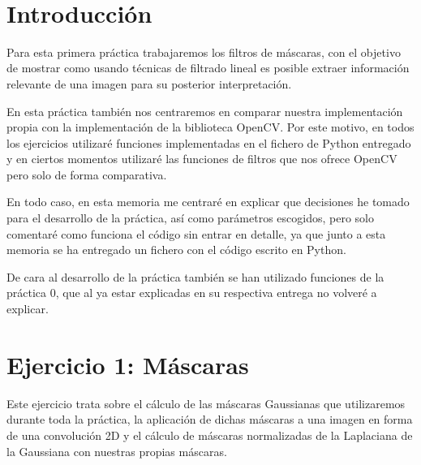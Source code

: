 \documentclass[12pt, spanish]{article}
\makeatletter
\let\thedate\@date
\makeatother
\begin{document}
\begin{titlepage}
    {\large \thedate}\\[0.5cm]
    {\doclicenseThis}

    \vfill

\end{titlepage}


\tableofcontents
\pagebreak



\section*{Introducción}

Para esta primera práctica trabajaremos los filtros de máscaras, con el objetivo de mostrar como usando técnicas de filtrado lineal es posible extraer información relevante de una imagen para su posterior interpretación.

En esta práctica también nos centraremos en comparar nuestra implementación propia con la implementación de la biblioteca OpenCV. Por este motivo, en todos los ejercicios utilizaré funciones implementadas en el fichero de Python entregado y en ciertos momentos utilizaré las funciones de filtros que nos ofrece OpenCV pero solo de forma comparativa.

En todo caso, en esta memoria me centraré en explicar que decisiones he tomado para el desarrollo de la práctica, así como parámetros escogidos, pero solo comentaré como funciona el código sin entrar en detalle, ya que junto a esta memoria se ha entregado un fichero con el código escrito en Python.

De cara al desarrollo de la práctica también se han utilizado funciones de la práctica 0, que al ya estar explicadas en su respectiva entrega no volveré a explicar.

\section{Ejercicio 1: Máscaras}

Este ejercicio trata sobre el cálculo de las máscaras Gaussianas que utilizaremos durante toda la práctica, la aplicación de dichas máscaras a una imagen en forma de una convolución 2D y el cálculo de máscaras normalizadas de la Laplaciana de la Gaussiana con nuestras propias máscaras.
\end{document}
